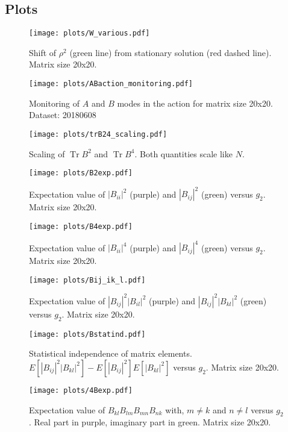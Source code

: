\documentclass[12pt,a4paper]{article}
\DeclareMathOperator{\Tr}{Tr}
\begin{document}
\subsection{Plots}
\begin{figure}[hp]
\centering
\texttt{[image: plots/W\_various.pdf]}
\caption{Shift of $\rho^2$ (green line) from stationary solution (red dashed line). Matrix size 20x20.}
\label{fig:Wvar}
\end{figure}
\begin{figure}[hp]
\centering
\texttt{[image: plots/ABaction\_monitoring.pdf]}
\caption{Monitoring of $A$ and $B$ modes in the action for matrix size 20x20. Dataset: 20180608}
\label{fig:ABaction}
\end{figure}
\begin{figure}[hp]
\centering
\texttt{[image: plots/trB24\_scaling.pdf]}
\caption{Scaling of $\Tr B^2$ and $\Tr B^4$. Both quantities scale like $N$.}
\label{fig:trB24scal}
\end{figure}
\begin{figure}[hp]
\centering
\texttt{[image: plots/B2exp.pdf]}
\caption{Expectation value of $|B_{ii}|^2$ (purple) and $|B_{ij}|^2$ (green) versus $g_2$. Matrix size 20x20.}
\label{fig:B2exp}
\end{figure}
\begin{figure}[hp]
\centering
\texttt{[image: plots/B4exp.pdf]}
\caption{Expectation value of $|B_{ii}|^4$ (purple) and $|B_{ij}|^4$ (green) versus $g_2$. Matrix size 20x20.}
\label{fig:B4exp}
\end{figure}
\begin{figure}[hp]
\centering
\texttt{[image: plots/Bij\_ik\_l.pdf]}
\caption{Expectation value of $|B_{ij}|^2 |B_{il}|^2$ (purple) and $|B_{ij}|^2 |B_{kl}|^2$ (green) versus $g_2$. Matrix size 20x20.}
\label{fig:Bij_ik_l}
\end{figure}
\begin{figure}[hp]
\centering
\texttt{[image: plots/Bstatind.pdf]}
\caption{Statistical independence of matrix elements. $E[|B_{ij}|^2|B_{kl}|^2] - E[|B_{ij}|^2]E[|B_{kl}|^2]$ versus $g_2$. Matrix size 20x20.}
\label{fig:Bstatind}
\end{figure}
\begin{figure}[hp]
\centering
\texttt{[image: plots/4Bexp.pdf]}
\caption{Expectation value of $B_{kl} B_{lm} B_{mn} B_{nk}$ with, $m \neq k$ and $n \neq l$ versus $g_2$. Real part in purple, imaginary part in green. Matrix size 20x20.}
\label{fig:4Bexp}
\end{figure}
\newpage
\end{document}
